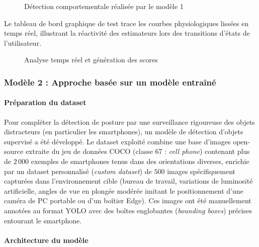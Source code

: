 \begin{figure}[H]
    \centering
    \caption{Détection comportementale réalisée par le modèle 1}
    \label{fig:model1_detection1}
\end{figure}

Le tableau de bord graphique de test trace les courbes physiologiques lissées en temps réel, illustrant la réactivité des estimateurs lors des transitions d'états de l'utilisateur.

\begin{figure}[H]
    \centering
    \caption{Analyse temps réel et génération des scores}
    \label{fig:model1_detection2}
\end{figure}

\subsubsection{Modèle 2 : Approche basée sur un modèle entraîné}

\paragraph{Préparation du dataset}

Pour compléter la détection de posture par une surveillance rigoureuse des objets distracteurs (en particulier les smartphones), un modèle de détection d'objets supervisé a été développé. Le dataset exploité combine une base d'images open-source extraite du jeu de données COCO (classe 67 : \textit{cell phone}) contenant plus de $2\,000$ exemples de smartphones tenus dans des orientations diverses, enrichie par un dataset personnalisé (\textit{custom dataset}) de $500$ images spécifiquement capturées dans l'environnement cible (bureau de travail, variations de luminosité artificielle, angles de vue en plongée modérée imitant le positionnement d'une caméra de PC portable ou d'un boîtier Edge). Ces images ont été manuellement annotées au format YOLO avec des boîtes englobantes (\textit{bounding boxes}) précises entourant le smartphone.

\paragraph{Architecture du modèle}

